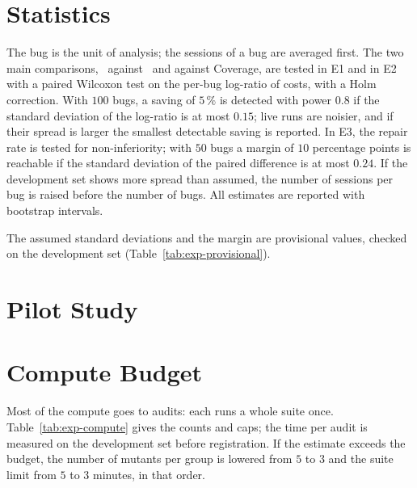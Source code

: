 \section{Statistics}
\label{sec:exp-size}

The bug is the unit of analysis; the sessions of a bug are averaged first.
The two main comparisons, \km\ against \frtp\ and against Coverage, are tested
in E1 and in E2 with a paired Wilcoxon test on the per-bug log-ratio of costs,
with a Holm correction. With $100$ bugs, a saving of $5\,\%$ is detected with
power $0.8$ if the standard deviation of the log-ratio is at most $0.15$; live
runs are noisier, and if their spread is larger the smallest detectable saving
is reported. In E3, the repair rate is tested for non-inferiority; with $50$
bugs a margin of $10$ percentage points is reachable if the standard deviation
of the paired difference is at most $0.24$. If the development set shows more
spread than assumed, the number of sessions per bug is raised before the number of
bugs. All estimates are reported with bootstrap intervals.

The assumed standard deviations and the margin are provisional values,
checked on the development set (Table~\ref{tab:exp-provisional}).

\section{Pilot Study}
\label{sec:exp-pilot}


\section{Compute Budget}
\label{sec:exp-compute}

Most of the compute goes to audits: each runs a whole suite once.
Table~\ref{tab:exp-compute} gives the counts and caps; the time per audit is
measured on the development set before registration. If the estimate exceeds
the budget, the number of mutants per group is lowered from $5$ to $3$ and the
suite limit from $5$ to $3$ minutes, in that order.

